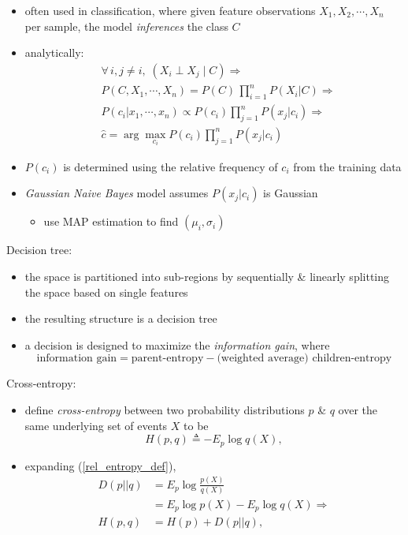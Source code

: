 \documentclass[onecolumn]{IEEEtran}
\newcommand{\beq}{\begin{equation}}
\newcommand{\eeq}{\end{equation}}
\newcommand{\bi}{\begin{itemize}}
\newcommand{\ei}{\end{itemize}}
\begin{document}
\begin{itemize}
        \item often used in classification, where given feature observations $X_1, X_2, \cdots, X_n$ per sample, the model \emph{inferences} the class $C$
        \item analytically:
        \beq\begin{split}
            & \forall \, i,j\neq i, \; (X_i \perp X_j \;|\; C) \Rightarrow\\
            &P(C,X_1,  \cdots, X_n) = P(C) \, \prod_{i=1}^n P(X_i|C)\Rightarrow\\
            &P(c_i | x_1,\cdots,x_n) \propto P(c_i) \prod_{j=1}^n P(x_j|c_i) \Rightarrow\\
            & \hat{c} = \arg\max_{c_i} P(c_i) \prod_{j=1}^n P(x_j|c_i)
        \end{split}\eeq
        \item $P(c_i)$ is determined using the relative frequency of $c_i$ from the training data
        \item \emph{Gaussian Naive Bayes} model assumes $ P(x_j|c_i)$ is Gaussian
        \bi
            \item use MAP estimation to find $(\mu_i,\sigma_i)$
        \ei
    \ei
    \item Decision tree:
    \bi
        \item the space is partitioned into sub-regions by sequentially \& linearly splitting the space based on single features
        \item the resulting structure is a decision tree
        \item a decision is designed to maximize the \emph{information gain}, where
        \beq
            \text{information gain} = \text{parent-entropy} - \text{(weighted average) } \text{children-entropy}
        \eeq
    \ei
    \item Cross-entropy:
    \bi
        \item define \emph{cross-entropy} between two probability distributions $p$ \& $q$ over the same underlying set of events $X$ to be
        \beq\label{cross_entropy_def}
            H(p,q) \triangleq  -E_p \log q(X),
        \eeq
        \item expanding (\ref{rel_entropy_def}),
        \beq\begin{split}
             D(p||q) &=  E_p \log \frac{p(X)}{q(X)}\\
             &= E_p \log p(X) - E_p \log q(X)\Rightarrow\\
            H(p,q)  &= H(p) + D(p||q),
        \end{split}\eeq

\end{itemize}
\end{document}
